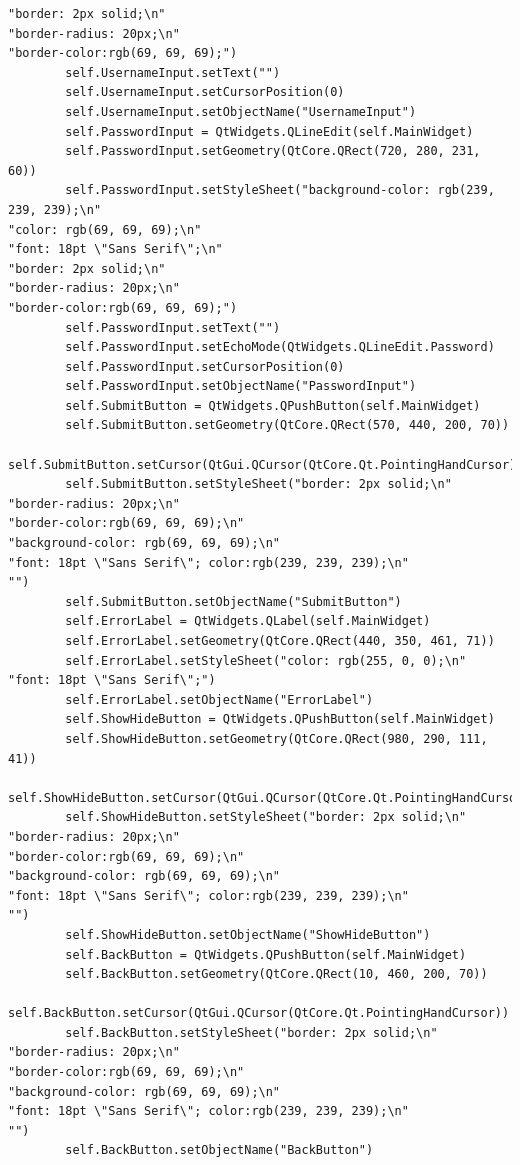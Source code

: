 \documentclass{article}
\begin{document}
\begin{lstlisting}
"border: 2px solid;\n"
"border-radius: 20px;\n"
"border-color:rgb(69, 69, 69);")
        self.UsernameInput.setText("")
        self.UsernameInput.setCursorPosition(0)
        self.UsernameInput.setObjectName("UsernameInput")
        self.PasswordInput = QtWidgets.QLineEdit(self.MainWidget)
        self.PasswordInput.setGeometry(QtCore.QRect(720, 280, 231, 60))
        self.PasswordInput.setStyleSheet("background-color: rgb(239, 239, 239);\n"
"color: rgb(69, 69, 69);\n"
"font: 18pt \"Sans Serif\";\n"
"border: 2px solid;\n"
"border-radius: 20px;\n"
"border-color:rgb(69, 69, 69);")
        self.PasswordInput.setText("")
        self.PasswordInput.setEchoMode(QtWidgets.QLineEdit.Password)
        self.PasswordInput.setCursorPosition(0)
        self.PasswordInput.setObjectName("PasswordInput")
        self.SubmitButton = QtWidgets.QPushButton(self.MainWidget)
        self.SubmitButton.setGeometry(QtCore.QRect(570, 440, 200, 70))
        self.SubmitButton.setCursor(QtGui.QCursor(QtCore.Qt.PointingHandCursor))
        self.SubmitButton.setStyleSheet("border: 2px solid;\n"
"border-radius: 20px;\n"
"border-color:rgb(69, 69, 69);\n"
"background-color: rgb(69, 69, 69);\n"
"font: 18pt \"Sans Serif\"; color:rgb(239, 239, 239);\n"
"")
        self.SubmitButton.setObjectName("SubmitButton")
        self.ErrorLabel = QtWidgets.QLabel(self.MainWidget)
        self.ErrorLabel.setGeometry(QtCore.QRect(440, 350, 461, 71))
        self.ErrorLabel.setStyleSheet("color: rgb(255, 0, 0);\n"
"font: 18pt \"Sans Serif\";")
        self.ErrorLabel.setObjectName("ErrorLabel")
        self.ShowHideButton = QtWidgets.QPushButton(self.MainWidget)
        self.ShowHideButton.setGeometry(QtCore.QRect(980, 290, 111, 41))
        self.ShowHideButton.setCursor(QtGui.QCursor(QtCore.Qt.PointingHandCursor))
        self.ShowHideButton.setStyleSheet("border: 2px solid;\n"
"border-radius: 20px;\n"
"border-color:rgb(69, 69, 69);\n"
"background-color: rgb(69, 69, 69);\n"
"font: 18pt \"Sans Serif\"; color:rgb(239, 239, 239);\n"
"")
        self.ShowHideButton.setObjectName("ShowHideButton")
        self.BackButton = QtWidgets.QPushButton(self.MainWidget)
        self.BackButton.setGeometry(QtCore.QRect(10, 460, 200, 70))
        self.BackButton.setCursor(QtGui.QCursor(QtCore.Qt.PointingHandCursor))
        self.BackButton.setStyleSheet("border: 2px solid;\n"
"border-radius: 20px;\n"
"border-color:rgb(69, 69, 69);\n"
"background-color: rgb(69, 69, 69);\n"
"font: 18pt \"Sans Serif\"; color:rgb(239, 239, 239);\n"
"")
        self.BackButton.setObjectName("BackButton")


\end{lstlisting}
\end{document}
